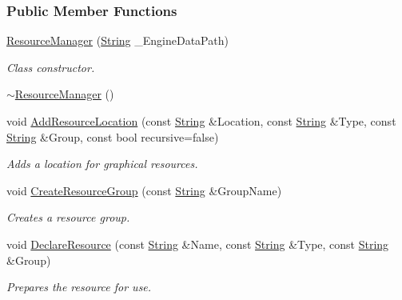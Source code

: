 \subsubsection*{Public Member Functions}
\begin{DoxyCompactItemize}
\item 
\hyperlink{classMezzanine_1_1ResourceManager_a39de49ab83e338cb14057e599c4db499}{ResourceManager} (\hyperlink{namespaceMezzanine_acf9fcc130e6ebf08e3d8491aebcf1c86}{String} \_\-EngineDataPath)
\begin{DoxyCompactList}\small\item\em Class constructor. \item\end{DoxyCompactList}\item 
\hyperlink{classMezzanine_1_1ResourceManager_a10cfccc0ecb1322995c170f2756460ea}{$\sim$ResourceManager} ()
\item 
void \hyperlink{classMezzanine_1_1ResourceManager_ae3304024ab5ef4c0e4a2763f8a253f1c}{AddResourceLocation} (const \hyperlink{namespaceMezzanine_acf9fcc130e6ebf08e3d8491aebcf1c86}{String} \&Location, const \hyperlink{namespaceMezzanine_acf9fcc130e6ebf08e3d8491aebcf1c86}{String} \&Type, const \hyperlink{namespaceMezzanine_acf9fcc130e6ebf08e3d8491aebcf1c86}{String} \&Group, const bool recursive=false)
\begin{DoxyCompactList}\small\item\em Adds a location for graphical resources. \item\end{DoxyCompactList}\item 
void \hyperlink{classMezzanine_1_1ResourceManager_a9f734f58e7e00d635876fef6a74554c4}{CreateResourceGroup} (const \hyperlink{namespaceMezzanine_acf9fcc130e6ebf08e3d8491aebcf1c86}{String} \&GroupName)
\begin{DoxyCompactList}\small\item\em Creates a resource group. \item\end{DoxyCompactList}\item 
void \hyperlink{classMezzanine_1_1ResourceManager_ab9e13ac880017cac65c57d1ccae008c4}{DeclareResource} (const \hyperlink{namespaceMezzanine_acf9fcc130e6ebf08e3d8491aebcf1c86}{String} \&Name, const \hyperlink{namespaceMezzanine_acf9fcc130e6ebf08e3d8491aebcf1c86}{String} \&Type, const \hyperlink{namespaceMezzanine_acf9fcc130e6ebf08e3d8491aebcf1c86}{String} \&Group)
\begin{DoxyCompactList}\small\item\em Prepares the resource for use. \item\end{DoxyCompactList}\item 

\end{DoxyCompactItemize}
